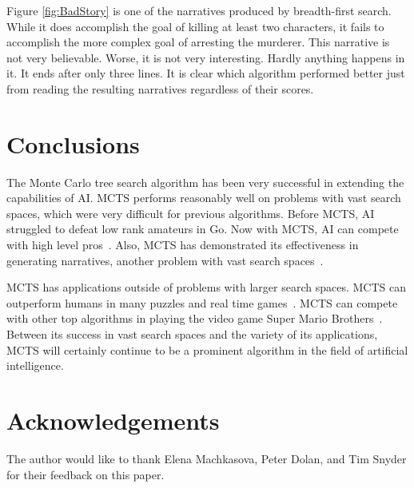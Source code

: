 \documentclass{sig-alternate}
\begin{document}
Figure \ref{fig:BadStory} is one of the narratives produced by breadth-first search. While it does accomplish the goal of killing at least two characters, it fails to accomplish the more complex goal of arresting the murderer. This narrative is not very believable. Worse, it is not very interesting. Hardly anything happens in it. It ends after only three lines. It is clear which algorithm performed better just from reading the resulting narratives regardless of their scores. 

\section{Conclusions}
The Monte Carlo tree search algorithm has been very successful in extending the capabilities of AI. MCTS performs reasonably well on problems with vast search spaces, which were very difficult for previous algorithms. Before MCTS, AI struggled to defeat low rank amateurs in Go. Now with MCTS, AI can compete with high level pros~\cite{TheGrandChallenge}. Also, MCTS has demonstrated its effectiveness in generating narratives, another problem with vast search spaces~\cite{Narrative}.

MCTS has applications outside of problems with larger search spaces. MCTS can outperform humans in many puzzles and real time games~\cite{Narrative}. MCTS can compete with other top algorithms in playing the video game Super Mario Brothers~\cite{Jacobsen:2014}. Between its success in vast search spaces and the variety of its applications, MCTS will certainly continue to be a prominent algorithm in the field of artificial intelligence.

\section{Acknowledgements}
The author would like to thank Elena Machkasova, Peter Dolan, and Tim Snyder for their feedback on this paper.

  
\end{document}
